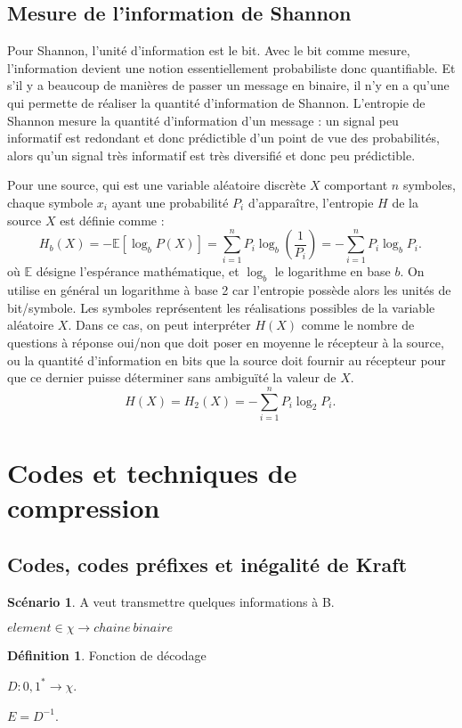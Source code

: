 \documentclass[10pt,a4paper]{article}
\theoremstyle{definition}
\newtheorem{definition}{Définition}
\newtheorem{scenario}{Scénario}
\numberwithin{lemma}{subsection}
\numberwithin{theorem}{subsection}
\numberwithin{definition}{subsection}
\numberwithin{proposition}{subsection}
\numberwithin{corollary}{subsection}
\numberwithin{property}{subsection}
\numberwithin{example}{subsection}
\numberwithin{heuristique}{subsection}
\numberwithin{scenario}{subsection}
\begin{document}
	\subsection{Mesure de l'information de Shannon}

Pour Shannon, l'unité d'information est le bit. Avec le bit comme mesure, l’information devient une notion essentiellement probabiliste donc quantifiable. Et s’il y a beaucoup de manières de passer un message en binaire, il n’y en a qu’une qui permette de réaliser la quantité d’information de Shannon. L’entropie de Shannon mesure la quantité d’information d’un message : un signal peu informatif est redondant et donc prédictible d’un point de vue des probabilités, alors qu’un signal très informatif est très diversifié et donc peu prédictible.
\par Pour une source, qui est une variable aléatoire discrète $X$ comportant $n$ symboles, chaque symbole $x_i$ ayant une probabilité $P_i$ d'apparaître, l'entropie $H$ de la source $X$ est définie comme :
$$H_b(X)= -\mathbb E [\log_b {P(X)}] = \sum_{i=1}^nP_i\log_b \left(\frac{1}{P_i}\right)=-\sum_{i=1}^nP_i\log_b P_i.\,\!$$
où $\mathbb  E$ désigne l'espérance mathématique, et $\log _{b}$ le logarithme en base $b$. On utilise en général un logarithme à base 2 car l'entropie possède alors les unités de bit/symbole. Les symboles représentent les réalisations possibles de la variable aléatoire $X$. Dans ce cas, on peut interpréter $H(X)$ comme le nombre de questions à réponse oui/non que doit poser en moyenne le récepteur à la source, ou la quantité d'information en bits que la source doit fournir au récepteur pour que ce dernier puisse déterminer sans ambiguïté la valeur de $X$.
$$H(X)=H_2(X)= -\sum_{i=1}^nP_i\log_2 P_i.\,\!$$

\section{Codes et techniques de compression}
	\subsection{Codes, codes préfixes et inégalité de Kraft}

\begin{scenario}
A veut transmettre quelques informations à B.
\end{scenario}

$element \in \chi \rightarrow chaine ~binaire$

\begin{definition}{Fonction de décodage}
\par $D : {0,1}^* \rightarrow \chi$.
\par $E = D^{-1}$.
\end{definition}
\end{document}

